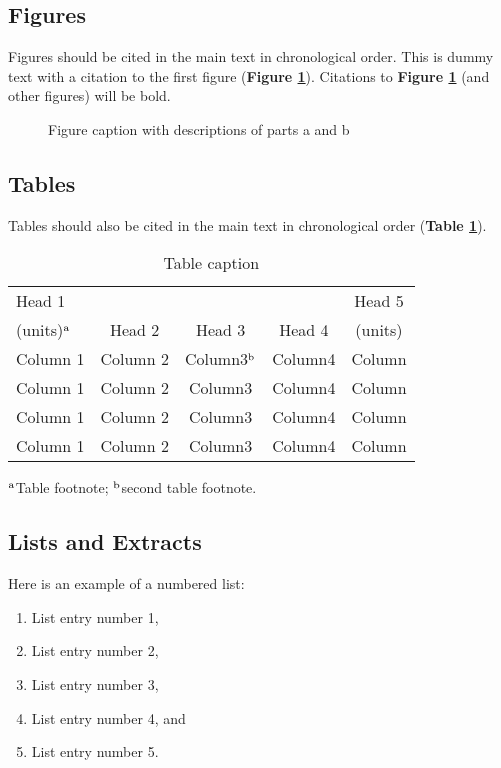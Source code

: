 \documentclass{ar-1col-S2O}
\begin{document}
\subsection{Figures}Figures should be cited in the main text in chronological order. This is dummy text with a citation to the first figure (\textbf{Figure \ref{fig1}}). Citations to \textbf{Figure \ref{fig1}} (and other figures) will be bold. 

\begin{figure}[h]
\caption{Figure caption with descriptions of parts a and b}
\label{fig1}
\end{figure}

\subsection{Tables} Tables should also be cited in the main text in chronological order (\textbf {Table \ref{tab1}}).

\begin{table}[h]
\caption{Table caption}
\label{tab1}
\begin{center}
\begin{tabular}{@{}l|c|c|c|c@{}}
\hline
Head 1 &&&&Head 5\\
{(}units)$^{\rm a}$ &Head 2 &Head 3 &Head 4 &{(}units)\\
\hline
Column 1 &Column 2 &Column3$^{\rm b}$ &Column4 &Column\\
Column 1 &Column 2 &Column3 &Column4 &Column\\
Column 1 &Column 2 &Column3 &Column4 &Column\\
Column 1 &Column 2 &Column3 &Column4 &Column\\
\hline
\end{tabular}
\end{center}
\begin{tabnote}
$^{\rm a}$Table footnote; $^{\rm b}$second table footnote.
\end{tabnote}
\end{table}

\subsection{Lists and Extracts} Here is an example of a numbered list:
\begin{enumerate}
\item List entry number 1,
\item List entry number 2,
\item List entry number 3,\item List entry number 4, and
\item List entry number 5.
\end{enumerate}
\end{document}
